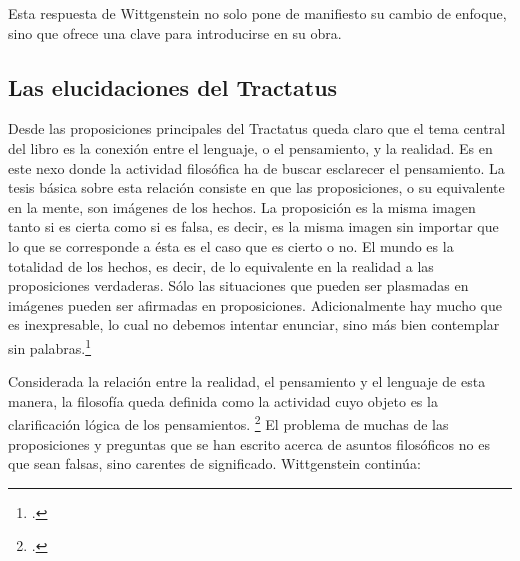 Esta respuesta de Wittgenstein no solo pone de manifiesto su cambio de enfoque,
sino que ofrece una clave para introducirse en su obra. 

\subsection{Las elucidaciones del Tractatus}
Desde las proposiciones principales del Tractatus
queda claro que el tema central del libro es la conexión entre el lenguaje, o el
pensamiento, y la realidad. 
Es en este nexo donde la actividad filosófica
ha de buscar esclarecer el pensamiento. 
La tesis básica sobre esta relación 
consiste en que las proposiciones, o su equivalente en la mente, son imágenes de
los hechos. 
La proposición es la misma imagen tanto
si es cierta como si es falsa, es decir, es la misma imagen sin importar que lo
que se corresponde a ésta es el caso que es cierto o no. El mundo es la
totalidad de los hechos, es decir, de lo equivalente en la realidad a las
proposiciones verdaderas. 
Sólo las situaciones que
pueden ser plasmadas en imágenes pueden ser afirmadas en proposiciones.
Adicionalmente hay mucho que es inexpresable, lo cual no debemos intentar
enunciar, sino más bien contemplar sin palabras.\footcite[cf. p.19]{IWT}  


Considerada la relación entre la realidad, el pensamiento y el lenguaje de esta
manera, la filosofía queda definida como la actividad cuyo objeto es la
clarificación lógica de los pensamientos. \footcite[4.112 p. 52]{tractatus} El
problema de muchas de las proposiciones y preguntas que se han escrito acerca de
asuntos filosóficos no es que sean falsas, sino carentes de significado.
Wittgenstein continúa:   

